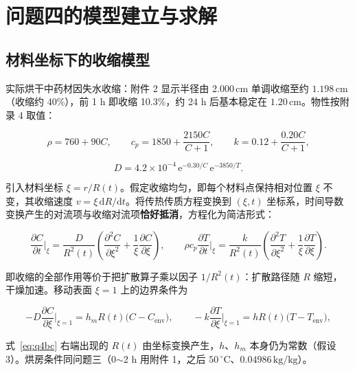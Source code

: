 \documentclass[withoutpreface,bwprint]{cumcmthesis} %
\begin{document}
\section{问题四的模型建立与求解}

\subsection{材料坐标下的收缩模型}

实际烘干中药材因失水收缩：附件 2 显示半径由 $2.000\,\mathrm{cm}$ 单调收缩至约 $1.198\,\mathrm{cm}$（收缩约 40\%），前 1 h 即收缩 10.3\%，约 24 h 后基本稳定在 $1.20\,\mathrm{cm}$。物性按附录 4 取值：

\begin{equation}
\rho=760+90C,\qquad
c_p=1850+\frac{2150C}{C+1},\qquad
k=0.12+\frac{0.20C}{C+1},
\label{eq:q4props}
\end{equation}

\begin{equation}
D = 4.2\times10^{-4}\,\mathrm{e}^{-0.30/C}\,\mathrm{e}^{-3850/T}.
\label{eq:q4D}
\end{equation}

引入材料坐标 $\xi=r/R(t)$。假定收缩均匀，即每个材料点保持相对位置 $\xi$ 不变，其收缩速度 $v=\xi\,\mathrm{d}R/\mathrm{d}t$。将传热传质方程变换到 $(\xi,t)$ 坐标系，时间导数变换产生的对流项与收缩对流项\textbf{恰好抵消}，方程化为简洁形式：

\begin{equation}
\frac{\partial C}{\partial t}\Big|_{\xi}
=\frac{D}{R^2(t)}\left(\frac{\partial^2 C}{\partial\xi^2}
+\frac{1}{\xi}\frac{\partial C}{\partial\xi}\right),
\qquad
\rho c_p\frac{\partial T}{\partial t}\Big|_{\xi}
=\frac{k}{R^2(t)}\left(\frac{\partial^2 T}{\partial\xi^2}
+\frac{1}{\xi}\frac{\partial T}{\partial\xi}\right).
\label{eq:q4eq}
\end{equation}

即收缩的全部作用等价于把扩散算子乘以因子 $1/R^2(t)$：扩散路径随 $R$ 缩短，干燥加速。移动表面 $\xi=1$ 上的边界条件为

\begin{equation}
-D\frac{\partial C}{\partial\xi}\Big|_{\xi=1}=h_m R(t)\bigl(C-C_{\mathrm{env}}\bigr),
\qquad
-k\frac{\partial T}{\partial\xi}\Big|_{\xi=1}=h R(t)\bigl(T-T_{\mathrm{env}}\bigr),
\label{eq:q4bc}
\end{equation}

式~\eqref{eq:q4bc} 右端出现的 $R(t)$ 由坐标变换产生，$h$、$h_m$ 本身仍为常数（假设 3）。烘房条件同问题三（0$\sim$2 h 用附件 1，之后 $50\,{}^\circ$C、$0.04986\,\mathrm{kg/kg}$）。
\end{document}
